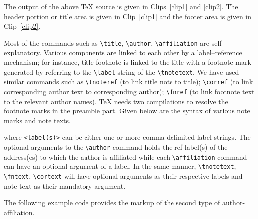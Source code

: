 \documentclass[a4paper,12pt]{article}
\begin{document}
The output of the above \TeX{} source is given in Clips~\ref{clip1} and
\ref{clip2}. The header portion or title area is given in
Clip~\ref{clip1} and the footer area is given in Clip~\ref{clip2}.

\vspace*{1pc}

\def\rulecolor{blue!70}
\def\rulecolor{orange}

\pagebreak

\def\rulecolor{blue!70}
\def\rulecolor{orange}

Most of the commands such as \verb+\title+, \verb+\author+,
\verb+\affiliation+ are self explanatory.  Various components are
linked to each other by a label--reference mechanism; for
instance, title footnote is linked to the title with a footnote
mark generated by referring to the \verb+\label+ string of
the \verb=\tnotetext=.  We have used similar commands
such as \verb=\tnoteref= (to link title note to title);
\verb=\corref= (to link corresponding author text to
corresponding author); \verb=\fnref= (to link footnote text to
the relevant author names).  \TeX{} needs two compilations to
resolve the footnote marks in the preamble part.
Given below are the syntax of various note marks and note texts.


\begin{vquote}
\end{vquote}

\noindent where \verb=<label(s)>= can be either one or more comma
delimited label strings. The optional arguments to the
\verb=\author= command holds the ref label(s) of the address(es)
to which the author is affiliated while each \verb=\affiliation=
command can have an optional argument of a label. In the same
manner, \verb=\tnotetext=, \verb=\fntext=, \verb=\cortext= will
have optional arguments as their respective labels and note text
as their mandatory argument.

The following example code provides the markup of the second type
of author-affiliation.
\end{document}
